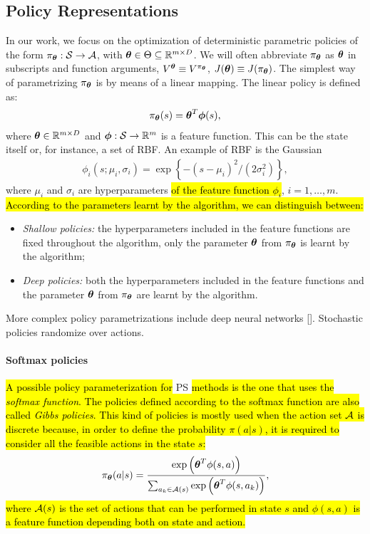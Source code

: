 \subsection{Policy Representations} \label{subsec:polrep}
In our work, we focus on the optimization of deterministic parametric policies of the form $\pi_{\boldsymbol{\theta}}:\mathcal{S}\to\mathcal{A}$, with $\boldsymbol{\theta}\in\Theta\subseteq\mathbb{R}^{m\times D}$. We will often abbreviate $\pi_{\boldsymbol{\theta}}$ as $\boldsymbol{\theta}$ in subscripts and function arguments, \eg $V^{\boldsymbol{\theta}} \equiv V^{\pi_{\boldsymbol{\theta}}}$, $J(\boldsymbol{\theta}) \equiv J(\pi_{\boldsymbol{\theta}})$. The simplest way of parametrizing $\pi_{\boldsymbol{\theta}}$ is by means of a linear mapping. The linear policy is defined as:
\begin{align} \pi_{\boldsymbol{\theta}}(s) = \boldsymbol{\theta}^T\boldsymbol{\phi}(s), \end{align} where $\boldsymbol{\theta}\in\mathbb{R}^{m\times D}$ and $\boldsymbol{\phi}:\mathcal{S}\to\mathbb{R}^m$ is a feature function. This can be the state itself or, for instance, a set of \acf{RBF}. An example of RBF is the Gaussian
\begin{align} \phi_i(s; \mu_i, \sigma_i) = \exp\left\{-{(s -\mu_i)^2}\big/{(2\sigma_i^2)}\right\}, \end{align}
where $\mu_i$ and $\sigma_i$ are hyperparameters \hl{of the feature function $\phi_i$}, $i=1,\dots,m$. \hl{According to the parameters learnt by the algorithm, we can distinguish between:}
\begin{itemize}
	\item \emph{Shallow policies: }the hyperparameters included in the feature functions are fixed throughout the algorithm, only the parameter $\boldsymbol{\theta}$ from $\pi_{\boldsymbol{\theta}}$ is learnt by the algorithm;
	\item \emph{Deep policies: }both the hyperparameters included in the feature functions and the parameter $\boldsymbol{\theta}$ from $\pi_{\boldsymbol{\theta}}$ are learnt by the algorithm. 
\end{itemize}
More complex policy parametrizations include deep neural networks [\cite{duan2016benchmarking}]. 
Stochastic policies randomize over actions. %

\paragraph{Softmax policies}
\hl{A possible policy parameterization for} \ac{PS} \hl{methods is the one that uses the \emph{softmax function}. The policies defined according to the softmax function are also called \emph{Gibbs policies}. This kind of policies is mostly used when the action set $\mathcal{A}$ is discrete because, in order to define the probability $\pi(a|s)$, it is required to consider all the feasible actions in the state $s$:}
\begin{align}
\pi_{\boldsymbol{\theta}}(a|s) = \frac{\exp\Big(\boldsymbol{\theta}^{T}\phi(s,a)\Big)}{\sum_{a_{k} \in \mathcal{A}(s)}\exp\Big(\boldsymbol{\theta}^{T}\phi(s,a_{k})\Big)},
\end{align}
\hl{where $\mathcal{A}(s)$ is the set of actions that can be performed in state $s$ and $\phi(s,a)$ is a feature function depending both on state and action.}

